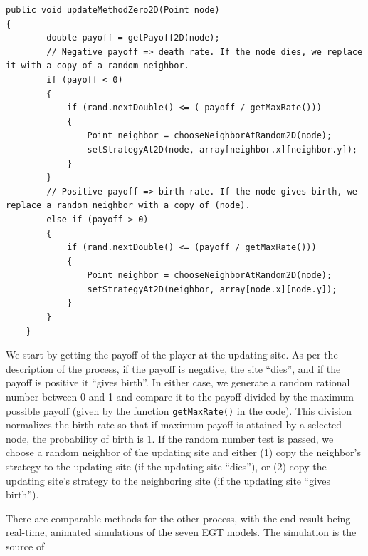 \documentclass[notitlepage,reqno]{amsart}
\begin{document}
\begin{samepage}
\begin{lstlisting}
public void updateMethodZero2D(Point node)
{
		double payoff = getPayoff2D(node);
		// Negative payoff => death rate. If the node dies, we replace it with a copy of a random neighbor.
		if (payoff < 0)
        {
            if (rand.nextDouble() <= (-payoff / getMaxRate()))
            {
				Point neighbor = chooseNeighborAtRandom2D(node);
				setStrategyAt2D(node, array[neighbor.x][neighbor.y]);
			}
		}
		// Positive payoff => birth rate. If the node gives birth, we replace a random neighbor with a copy of (node).
		else if (payoff > 0)
		{
			if (rand.nextDouble() <= (payoff / getMaxRate()))
			{
				Point neighbor = chooseNeighborAtRandom2D(node);
				setStrategyAt2D(neighbor, array[node.x][node.y]);
			}
		}
	}
\end{lstlisting}
\end{samepage}

We start by getting the payoff of the player at the updating site. As
per the description of the process, if the payoff is negative, the
site ``dies'', and if the payoff is positive it ``gives birth''. In
either case, we generate a random rational number between 0 and 1 and
compare it to the payoff divided by the maximum possible payoff
(given by the function \texttt{getMaxRate()} in the code). This division
normalizes the birth rate so that if maximum payoff is attained by a
selected node, the probability of birth is 1. If the random number test is passed, we choose a random neighbor of the updating site and either (1) copy the neighbor's strategy to the updating site (if the updating site ``dies''), or (2) copy the updating site's strategy to the neighboring site (if the updating site ``gives birth'').

There are comparable methods for the other process, with the end result being real-time, animated simulations of the seven EGT models. The simulation is the source of 
\end{document}
